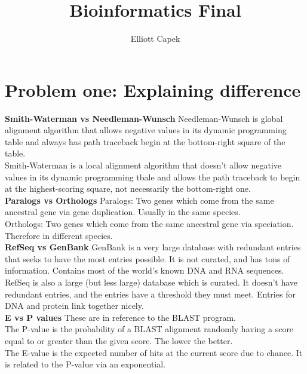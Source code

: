 \documentclass[10pt]{article} %
\title{Bioinformatics Final}
\author{Elliott Capek}
\begin{document}
\maketitle{}

\section{Problem one: Explaining difference}
\textbf{Smith-Waterman vs Needleman-Wunsch}
Needleman-Wunsch is  global alignment algorithm that allows negative
values in its dynamic programming table and always has path traceback
begin at the bottom-right square of the table.\\

Smith-Waterman is a local alignment algorithm that doesn't allow negative
values in its dynamic programming tbale and allows the path traceback to
begin at the highest-scoring square, not necessarily the bottom-right one.\\

\textbf{Paralogs vs Orthologs}
Paralogs: Two genes which come from the same ancestral gene via gene duplication.
Usually in the same species.\\

Orthologs: Two genes which come from the same ancestral gene via speciation.
Therefore in different species.\\

\textbf{RefSeq vs GenBank}
GenBank is a very large database with redundant entries that seeks to have
the most entries possible. It is not curated, and has tons of information. Contains
most of the world's known DNA and RNA sequences.\\

RefSeq is also a large (but less large) database which is curated. It doesn't have
redundant entries, and the entries have a threshold they must meet. Entries for DNA
and protein link together nicely.\\

\textbf{E vs P values}
These are in reference to the BLAST program.\\

The P-value is the probability of a BLAST alignment randomly having a score equal to
or greater than the given score. The lower the better.\\

The E-value is the expected number of hits at the current score due to chance. It is
related to the P-value via an exponential.\\
\end{document}
